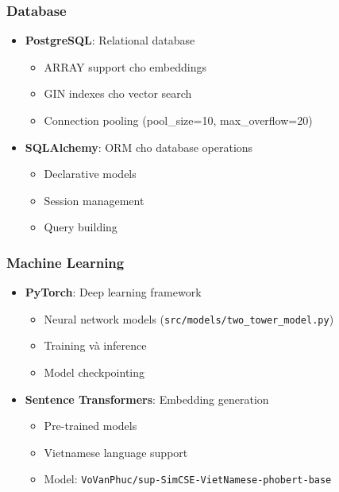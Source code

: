 \subsubsection{Database}

\begin{itemize}
    \item \textbf{PostgreSQL}: Relational database
    \begin{itemize}
        \item ARRAY support cho embeddings
        \item GIN indexes cho vector search
        \item Connection pooling (pool\_size=10, max\_overflow=20)
    \end{itemize}
    
    \item \textbf{SQLAlchemy}: ORM cho database operations
    \begin{itemize}
        \item Declarative models
        \item Session management
        \item Query building
    \end{itemize}
\end{itemize}

\subsubsection{Machine Learning}

\begin{itemize}
    \item \textbf{PyTorch}: Deep learning framework
    \begin{itemize}
        \item Neural network models (\texttt{src/models/two\_tower\_model.py})
        \item Training và inference
        \item Model checkpointing
    \end{itemize}
    
    \item \textbf{Sentence Transformers}: Embedding generation
    \begin{itemize}
        \item Pre-trained models
        \item Vietnamese language support
        \item Model: \texttt{VoVanPhuc/sup-SimCSE-VietNamese-phobert-base}
    \end{itemize}
\end{itemize}

